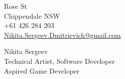 \documentclass[]{cv-class}
\begin{document}
\thispagestyle{empty}

\begin{minipage}[t]{0.3\textwidth}
\vfill
Rose St \\ Chippendale NSW \\
+61 426 284 203 \\
\href{mailto:Nikita.Sergeev.Dmitrievich+CV@gmail.com}
    {Nikita.Sergeev.Dmitrievich@gmail.com}
\end{minipage}
\hfill
\begin{minipage}[t]{0.65\textwidth}
\begin{flushright}
    {\Huge
        \textcolor{candidate_name_col}{Nikita Sergeev} 
    } \\
    {\large Technical Artist, Software Developer \\ Aspired Game Developer}
\end{flushright}
\vfill
\end{minipage}

\vspace{4mm}

\bigSeparator{2pt}
\end{document}
